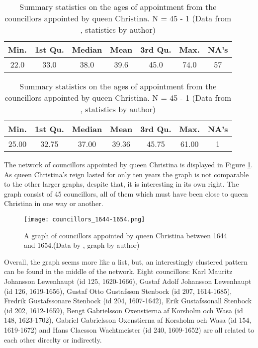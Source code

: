 \begin{table}
	\caption[Summary statistics on the councillors ages of appointment]{Summary statistics on the councillors ages of appointment from the whole dataset (including the reign of Christina). NA meaning a missing value. N = 257 - 57 (Data from \cite{councillorsDS}, statistics by author)}
	\label{councillorsages}
	\centering
	\begin{tabular}{c c c c c c c}
		\hline
		Min. & 1st Qu. & Median & Mean & 3rd Qu. & Max. & NA's \\
		\hline
		22.0 & 33.0 & 38.0 & 39.6 & 45.0 & 74.0 & 57 \\
		\hline
	\end{tabular}
	
	\caption[Summary statistics on the ages of appointment from the councillors appointed by queen Christina]{Summary statistics on the ages of appointment from the councillors appointed by queen Christina. N = 45 - 1 (Data from \cite{councillorsDS}, statistics by author)}
	\label{agesByChristina}
	\centering
	\begin{tabular}{c c c c c c c}
		\hline
		Min. & 1st Qu. & Median & Mean & 3rd Qu. & Max. & NA's \\
		\hline
		25.00 & 32.75 & 37.00 & 39.36 & 45.75 & 61.00 & 1\\
		\hline
	\end{tabular}
\end{table}

The network of councillors appointed by queen Christina is displayed in Figure \ref{queenChristinaCouncillors}. As queen Christina's reign lasted for only ten years the graph is not comparable to the other larger graphs, despite that, it is interesting in its own right. The graph consist of 45 councillors, all of them which must have been close to queen Christina in one way or another.

\begin{figure}	
	\texttt{[image: councillors\_1644-1654.png]}
	\caption[Councillors appointed by queen Christina]{A graph of councillors appointed by queen Christina between 1644 and 1654.(Data by \cite{councillorsDS}, graph by author)}
	\label{queenChristinaCouncillors}
	\centering
\end{figure}

Overall, the graph seems more like a list, but, an interestingly clustered pattern can be found in the middle of the network. Eight councillors: Karl Mauritz Johansson Lewenhaupt (id 125, 1620-1666), Gustaf Adolf Johansson Lewenhaupt (id 126, 1619-1656), Gustaf Otto Gustafsson Stenbock (id 207, 1614-1685), Fredrik Gustafssonare Stenbock (id 204, 1607-1642), Erik Gustafssonall Stenbock (id 202, 1612-1659), Bengt Gabrielsson Oxenstierna af Korsholm och Wasa (id 148, 1623-1702), Gabriel Gabrielsson Oxenstierna af Korsholm och Wasa (id 154, 1619-1672) and Hans Claesson Wachtmeister (id 240, 1609-1652) are all related to each other direclty or indirectly. 


